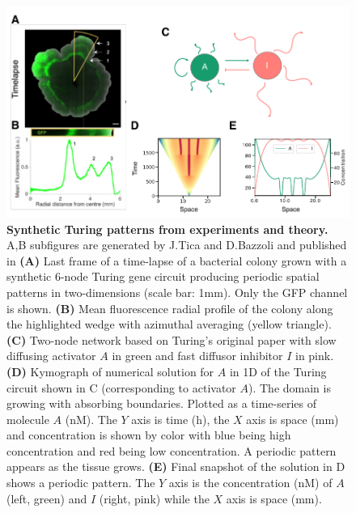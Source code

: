 \documentclass[10pt,letterpaper]{article}
\begin{document}
\begin{figure}[bp!]
    \includegraphics[width=1\textwidth]{figures/biological_example}

    \caption{{\bf Synthetic Turing patterns from experiments and theory.} A,B subfigures are generated by J.Tica and D.Bazzoli and published in \cite{Oliver2023} \textbf{(A)} Last frame of a time-lapse of a bacterial colony grown with a synthetic 6-node Turing gene circuit producing periodic spatial patterns in two-dimensions (scale bar: 1mm). Only the GFP channel is shown. \textbf{(B)} Mean fluorescence radial profile of the colony along the highlighted wedge with azimuthal averaging (yellow triangle). \textbf{(C)} Two-node network based on Turing’s original paper \cite{Turing1952} with slow diffusing activator $A$ in green and fast diffusor inhibitor $I$ in pink. \textbf{(D)} Kymograph of numerical solution for $A$ in 1D of the Turing circuit shown in C (corresponding to activator $A$). The domain is growing with absorbing boundaries. Plotted as a time-series of molecule $A$ (nM). The $Y$ axis is time (h), the $X$ axis is space (mm) and concentration is shown by color with blue being high concentration and red being low concentration. A periodic pattern appears as the tissue grows. \textbf{(E)} Final snapshot of the solution in D shows a periodic pattern. The $Y$ axis is the concentration (nM) of $A$ (left, green) and $I$ (right, pink) while the $X$ axis is space (mm). }
    \label{fig1}
\end{figure}
\end{document}
